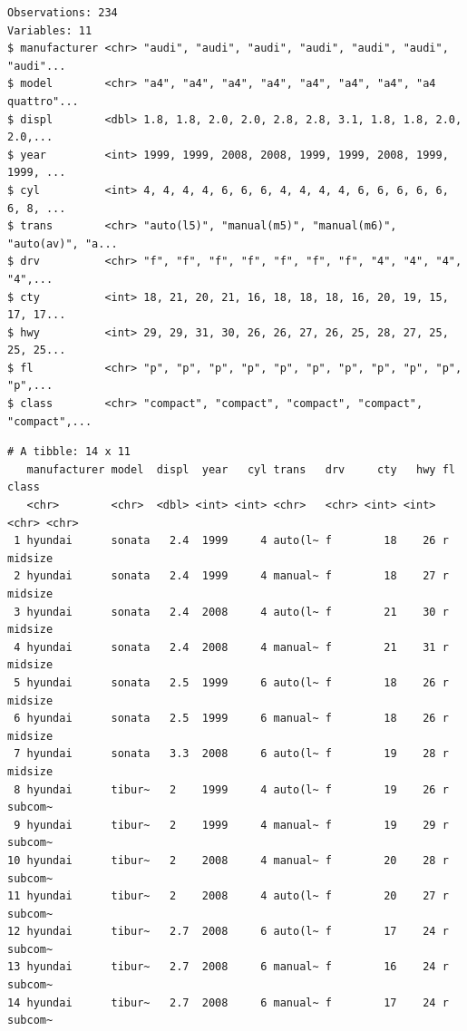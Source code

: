\documentclass[
  11pt,
]{krantz}
\newenvironment{Shaded}{\begin{snugshade}}{\end{snugshade}}
\newcommand{\CommentTok}[1]{\textcolor[rgb]{0.37,0.37,0.37}{\textit{#1}}}
\newcommand{\KeywordTok}[1]{\textcolor[rgb]{0.27,0.27,0.27}{\textbf{#1}}}
\newcommand{\NormalTok}[1]{#1}
\newcommand{\OperatorTok}[1]{\textcolor[rgb]{0.43,0.43,0.43}{\textbf{#1}}}
\newcommand{\StringTok}[1]{\textcolor[rgb]{0.5,0.5,0.5}{#1}}
\begin{document}
\begin{verbatim}
Observations: 234
Variables: 11
$ manufacturer <chr> "audi", "audi", "audi", "audi", "audi", "audi", "audi"...
$ model        <chr> "a4", "a4", "a4", "a4", "a4", "a4", "a4", "a4 quattro"...
$ displ        <dbl> 1.8, 1.8, 2.0, 2.0, 2.8, 2.8, 3.1, 1.8, 1.8, 2.0, 2.0,...
$ year         <int> 1999, 1999, 2008, 2008, 1999, 1999, 2008, 1999, 1999, ...
$ cyl          <int> 4, 4, 4, 4, 6, 6, 6, 4, 4, 4, 4, 6, 6, 6, 6, 6, 6, 8, ...
$ trans        <chr> "auto(l5)", "manual(m5)", "manual(m6)", "auto(av)", "a...
$ drv          <chr> "f", "f", "f", "f", "f", "f", "f", "4", "4", "4", "4",...
$ cty          <int> 18, 21, 20, 21, 16, 18, 18, 18, 16, 20, 19, 15, 17, 17...
$ hwy          <int> 29, 29, 31, 30, 26, 26, 27, 26, 25, 28, 27, 25, 25, 25...
$ fl           <chr> "p", "p", "p", "p", "p", "p", "p", "p", "p", "p", "p",...
$ class        <chr> "compact", "compact", "compact", "compact", "compact",...
\end{verbatim}

\begin{Shaded}
\end{Shaded}

\begin{verbatim}
# A tibble: 14 x 11
   manufacturer model  displ  year   cyl trans   drv     cty   hwy fl    class  
   <chr>        <chr>  <dbl> <int> <int> <chr>   <chr> <int> <int> <chr> <chr>  
 1 hyundai      sonata   2.4  1999     4 auto(l~ f        18    26 r     midsize
 2 hyundai      sonata   2.4  1999     4 manual~ f        18    27 r     midsize
 3 hyundai      sonata   2.4  2008     4 auto(l~ f        21    30 r     midsize
 4 hyundai      sonata   2.4  2008     4 manual~ f        21    31 r     midsize
 5 hyundai      sonata   2.5  1999     6 auto(l~ f        18    26 r     midsize
 6 hyundai      sonata   2.5  1999     6 manual~ f        18    26 r     midsize
 7 hyundai      sonata   3.3  2008     6 auto(l~ f        19    28 r     midsize
 8 hyundai      tibur~   2    1999     4 auto(l~ f        19    26 r     subcom~
 9 hyundai      tibur~   2    1999     4 manual~ f        19    29 r     subcom~
10 hyundai      tibur~   2    2008     4 manual~ f        20    28 r     subcom~
11 hyundai      tibur~   2    2008     4 auto(l~ f        20    27 r     subcom~
12 hyundai      tibur~   2.7  2008     6 auto(l~ f        17    24 r     subcom~
13 hyundai      tibur~   2.7  2008     6 manual~ f        16    24 r     subcom~
14 hyundai      tibur~   2.7  2008     6 manual~ f        17    24 r     subcom~
\end{verbatim}
\end{document}
